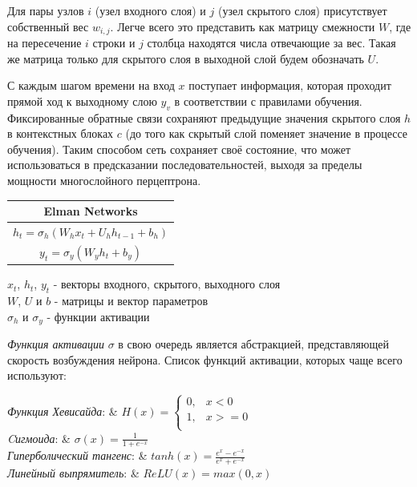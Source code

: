 	Для пары узлов $i$ (узел входного слоя) и $j$ (узел скрытого слоя) присутствует собственный вес $w_{i,j}$. Легче всего это представить как матрицу смежности $W$, где на пересечение $i$ строки и $j$ столбца находятся числа отвечающие за вес. Такая же матрица только для скрытого слоя в выходной слой будем обозначать $U$. 
	
	С каждым шагом времени на вход $x$ поступает информация, которая проходит прямой ход к выходному слою $y_v$ в соответствии с правилами обучения. Фиксированные обратные связи сохраняют предыдущие значения скрытого слоя $h$ в контекстных блоках $c$ (до того как скрытый слой поменяет значение в процессе обучения). Таким способом сеть сохраняет своё состояние, что может использоваться в предсказании последовательностей, выходя за пределы мощности многослойного перцептрона.
	
	\begin{table}[h]
		\centering
		\begin{tabular}{|c|} 
			\hline
			\textbf{Elman Networks}  \\ 
			\hline
			$ h_{t} = \sigma_{h}(W_h x_t + U_h h_{t - 1} + b_h) $ \\ 
			$ y_{t} = \sigma_{y}(W_y h_t + b_y) $ \\
			\hline
		\end{tabular}
	\end{table}
	\begin{tabbing}
		$x_t$, $h_t$, $y_t$  - векторы входного, скрытого, выходного слоя        \\
		$W$, $U$ и $b$ - матрицы и вектор параметров       \\
		$\sigma_h$ и $\sigma_y$ - функции активации
	\end{tabbing}
	
	\textit{Функция активации} $\sigma$ в свою очередь является абстракцией, представляющей скорость возбуждения нейрона. Список функций активации, которых чаще всего используют:
	
	\begin{tabbing}
			\textit{Функция Хевисайда}:       &   
			$ H(x) = 
			\begin{cases}
				0, & x < 0 \\
				1, & x >= 0 \\
			\end{cases}$ \\ 
			\textit{Cигмоида}:                &  $\sigma(x) = \frac{1}{1 + e^{-x}}$ \\ 
			\textit{Гиперболический тангенс}: &  $tanh(x) = \frac{e^x - e^{-x}}{e^x + e^{-x}}$ \\ 
			\textit{Линейный выпрямитель}:    &  $ReLU(x) = max(0, x)$ \\
	\end{tabbing}

